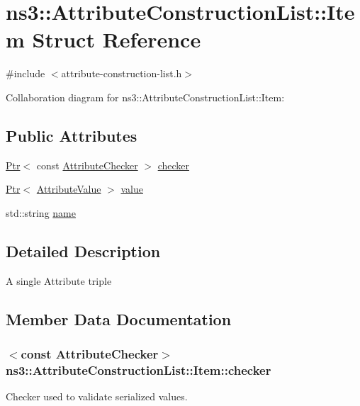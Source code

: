 \hypertarget{structns3_1_1AttributeConstructionList_1_1Item}{}\section{ns3\+:\+:Attribute\+Construction\+List\+:\+:Item Struct Reference}
\label{structns3_1_1AttributeConstructionList_1_1Item}


{\ttfamily \#include $<$attribute-\/construction-\/list.\+h$>$}



Collaboration diagram for ns3\+:\+:Attribute\+Construction\+List\+:\+:Item\+:
\subsection*{Public Attributes}
\begin{DoxyCompactItemize}
\item 
\hyperlink{classns3_1_1Ptr}{Ptr}$<$ const \hyperlink{classns3_1_1AttributeChecker}{Attribute\+Checker} $>$ \hyperlink{structns3_1_1AttributeConstructionList_1_1Item_a56055c136e4c41f56eaca2626d708a67}{checker}
\item 
\hyperlink{classns3_1_1Ptr}{Ptr}$<$ \hyperlink{classns3_1_1AttributeValue}{Attribute\+Value} $>$ \hyperlink{structns3_1_1AttributeConstructionList_1_1Item_ab437777eee8a81403a76c8ef80654e83}{value}
\item 
std\+::string \hyperlink{structns3_1_1AttributeConstructionList_1_1Item_a0261fa7e7ec744cdb44fc9ba71128483}{name}
\end{DoxyCompactItemize}


\subsection{Detailed Description}
A single Attribute triple 

\subsection{Member Data Documentation}
\subsubsection[{\texorpdfstring{checker}{checker}}]{$<$const {\bf Attribute\+Checker}$>$ ns3\+::\+Attribute\+Construction\+List\+::\+Item\+::checker}\hypertarget{structns3_1_1AttributeConstructionList_1_1Item_a56055c136e4c41f56eaca2626d708a67}{}\label{structns3_1_1AttributeConstructionList_1_1Item_a56055c136e4c41f56eaca2626d708a67}
Checker used to validate serialized values. 
